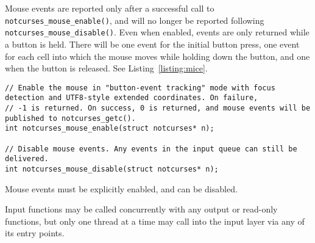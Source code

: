 Mouse events are reported only after a successful call to
\texttt{notcurses\_mouse\_enable()}, and will no longer be reported following
\texttt{notcurses\_mouse\_disable()}. Even when enabled, events are only
returned while a button is held. There will be one event for the initial button
press, one event for each cell into which the mouse moves while holding down
the button, and one when the button is released. See Listing~\ref{listing:mice}.

\begin{listing}[!htb]
\begin{verbatim}
// Enable the mouse in "button-event tracking" mode with focus detection and UTF8-style extended coordinates. On failure,
// -1 is returned. On success, 0 is returned, and mouse events will be published to notcurses_getc().
int notcurses_mouse_enable(struct notcurses* n);

// Disable mouse events. Any events in the input queue can still be delivered.
int notcurses_mouse_disable(struct notcurses* n);
\end{verbatim}
\caption{Mouse events must be explicitly enabled, and can be disabled.}
\label{listing:mice}
\end{listing}

Input functions may be called concurrently with any output or read-only
functions, but only one thread at a time may call into the input layer via any
of its entry points.

